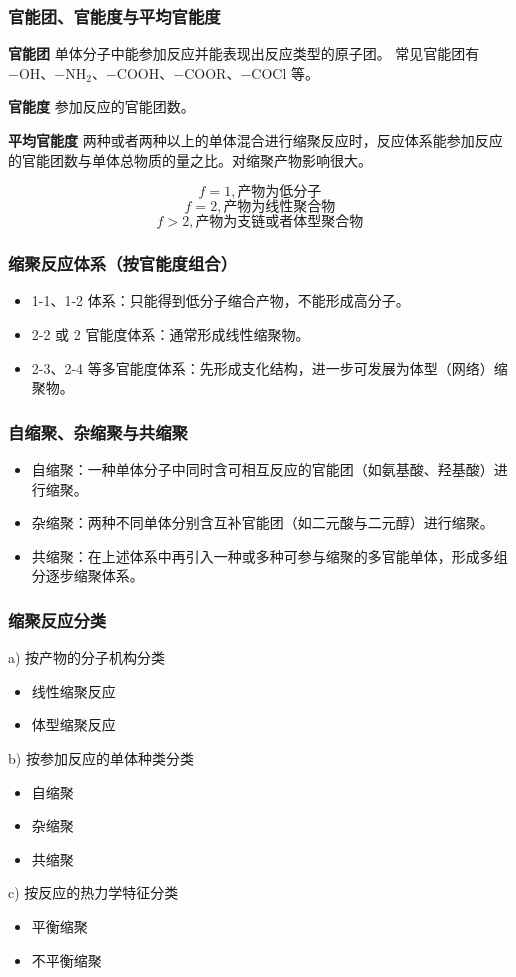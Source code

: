﻿\documentclass[12pt,a4paper]{article}
\begin{document}
\subsubsection{官能团、官能度与平均官能度}
{\bf 官能团} 单体分子中能参加反应并能表现出反应类型的原子团。
常见官能团有 $\mathrm{-OH}$、$\mathrm{-NH_2}$、$\mathrm{-COOH}$、$\mathrm{-COOR}$、$\mathrm{-COCl}$ 等。

{\bf 官能度} 参加反应的官能团数。

{\bf 平均官能度} 两种或者两种以上的单体混合进行缩聚反应时，反应体系能参加反应的官能团数与单体总物质的量之比。对缩聚产物影响很大。

$$f=1,{\text{产物为低分子}}$$
$$f=2,{\text{产物为线性聚合物}}$$
$$f>2,{\text{产物为支链或者体型聚合物}}$$

\subsubsection{缩聚反应体系（按官能度组合）}
\begin{itemize}
  \item 1-1、1-2 体系：只能得到低分子缩合产物，不能形成高分子。
  \item 2-2 或 2 官能度体系：通常形成线性缩聚物。
  \item 2-3、2-4 等多官能度体系：先形成支化结构，进一步可发展为体型（网络）缩聚物。
\end{itemize}

\subsubsection{自缩聚、杂缩聚与共缩聚}
\begin{itemize}
  \item 自缩聚：一种单体分子中同时含可相互反应的官能团（如氨基酸、羟基酸）进行缩聚。
  \item 杂缩聚：两种不同单体分别含互补官能团（如二元酸与二元醇）进行缩聚。
  \item 共缩聚：在上述体系中再引入一种或多种可参与缩聚的多官能单体，形成多组分逐步缩聚体系。
\end{itemize}

\subsubsection{缩聚反应分类}
a) 按产物的分子机构分类
\begin{itemize}
\item 线性缩聚反应
\item 体型缩聚反应
\end{itemize}
b) 按参加反应的单体种类分类
\begin{itemize}
\item 自缩聚
\item 杂缩聚
\item 共缩聚
\end{itemize}
c) 按反应的热力学特征分类
\begin{itemize}
\item 平衡缩聚
\item 不平衡缩聚
\end{itemize}
\end{document}
